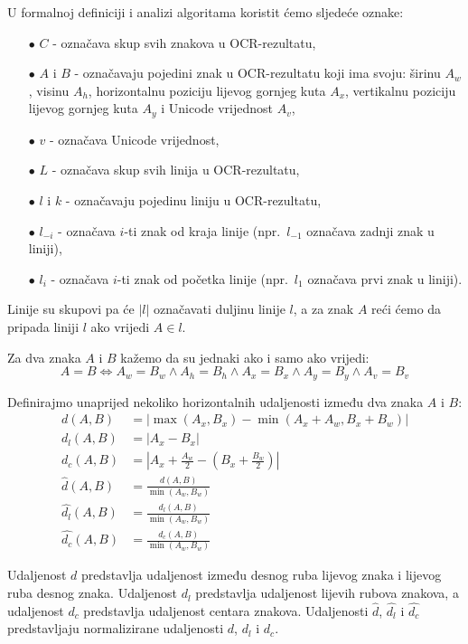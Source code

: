 \documentclass[times, utf8, zavrsni]{fer}
\begin{document}
U formalnoj definiciji i analizi algoritama koristit ćemo sljedeće oznake:
\begin{itemize}
    \item[$\bullet$] $C$ - označava skup svih znakova u OCR-rezultatu,
    \item[$\bullet$] $A$ i $B$ - označavaju pojedini znak u OCR-rezultatu koji ima svoju: širinu $A_w$, visinu $A_h$, horizontalnu poziciju lijevog
    gornjeg kuta $A_x$, vertikalnu poziciju lijevog gornjeg kuta $A_y$ i
    Unicode vrijednost $A_v$,
    \item[$\bullet$] $v$ - označava Unicode vrijednost,
    \item[$\bullet$] $L$ - označava skup svih linija u OCR-rezultatu,
    \item[$\bullet$] $l$ i $k$ - označavaju pojedinu liniju u OCR-rezultatu,
    \item[$\bullet$] $l_{-i}$ - označava $i$-ti znak od kraja linije
    (npr.\ $l_{-1}$ označava zadnji znak u liniji),
    \item[$\bullet$] $l_i$ - označava $i$-ti znak od početka linije (npr.\ $l_1$ označava prvi znak u liniji).
\end{itemize}

Linije su skupovi pa će $|l|$ označavati duljinu linije $l$,
a za znak $A$ reći ćemo da pripada liniji $l$ ako vrijedi $A \in l$.

Za dva znaka $A$ i $B$ kažemo da su jednaki ako i samo ako vrijedi:
\[
A = B \iff
A_w = B_w \land A_h = B_h \land A_x = B_x \land A_y = B_y \land A_v = B_v
\]

Definirajmo unaprijed nekoliko horizontalnih udaljenosti između dva znaka $A$ i
$B$:
\begin{align}
d(A, B) &= |\max(A_x, B_x) - \min(A_x + A_w, B_x + B_w)| \\
d_l(A, B) &= |A_x - B_x| \\
d_c(A, B) &= |A_x + \frac{A_w}{2} - (B_x + \frac{B_w}{2})| \\
\hat{d}(A, B) &= \frac{d(A, B)}{\min(A_w, B_w)} \\
\hat{d_l}(A, B) &= \frac{d_l(A, B)}{\min(A_w, B_w)} \\
\hat{d_c}(A, B) &= \frac{d_c(A, B)}{\min(A_w, B_w)}
\end{align}

Udaljenost $d$ predstavlja udaljenost između desnog ruba lijevog znaka i
lijevog ruba desnog znaka. Udaljenost $d_l$ predstavlja udaljenost lijevih
rubova znakova, a udaljenost $d_c$ predstavlja udaljenost centara znakova.
Udaljenosti $\hat{d}$, $\hat{d_l}$ i $\hat{d_c}$ predstavljaju normalizirane
udaljenosti $d$, $d_l$ i $d_c$.
\end{document}
